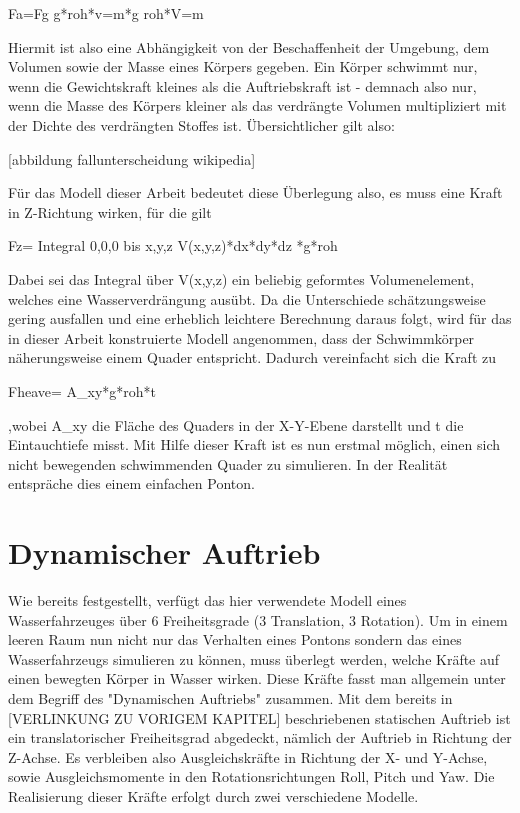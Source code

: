 Fa=Fg
g*roh*v=m*g
roh*V=m

Hiermit ist also eine Abhängigkeit von der Beschaffenheit der Umgebung, dem Volumen sowie der Masse eines Körpers gegeben. 
Ein Körper schwimmt nur, wenn die Gewichtskraft kleines als die Auftriebskraft ist - demnach also nur, wenn die Masse des Körpers kleiner als das verdrängte Volumen multipliziert mit der Dichte des verdrängten Stoffes ist. Übersichtlicher gilt also:

[abbildung fallunterscheidung wikipedia]

Für das Modell dieser Arbeit bedeutet diese Überlegung also, es muss eine Kraft in Z-Richtung wirken, für die gilt

Fz= Integral 0,0,0 bis x,y,z V(x,y,z)*dx*dy*dz *g*roh

Dabei sei das Integral über V(x,y,z) ein beliebig geformtes Volumenelement, welches eine Wasserverdrängung ausübt. 
Da die Unterschiede schätzungsweise gering ausfallen und eine erheblich leichtere Berechnung daraus folgt, wird für das in dieser Arbeit konstruierte Modell angenommen, dass der Schwimmkörper näherungsweise einem Quader entspricht. Dadurch vereinfacht sich die Kraft zu

Fheave= A_xy*g*roh*t

,wobei A_xy die Fläche des Quaders in der X-Y-Ebene darstellt und t die Eintauchtiefe misst. 
Mit Hilfe dieser Kraft ist es nun erstmal möglich, einen sich nicht bewegenden schwimmenden Quader zu simulieren. In der Realität entspräche dies einem einfachen Ponton.

%
\section{Dynamischer Auftrieb}
%
Wie bereits festgestellt, verfügt das hier verwendete Modell eines Wasserfahrzeuges über 6 Freiheitsgrade (3 Translation, 3 Rotation). Um in einem leeren Raum nun nicht nur das Verhalten eines Pontons sondern das eines Wasserfahrzeugs simulieren zu können, muss überlegt werden, welche Kräfte auf einen bewegten Körper in Wasser wirken. Diese Kräfte fasst man allgemein unter dem Begriff des "Dynamischen Auftriebs" zusammen.
Mit dem bereits in [VERLINKUNG ZU VORIGEM KAPITEL] beschriebenen statischen Auftrieb ist ein translatorischer Freiheitsgrad abgedeckt, nämlich der Auftrieb in Richtung der Z-Achse. Es verbleiben also Ausgleichskräfte in Richtung der X- und Y-Achse, sowie Ausgleichsmomente in den Rotationsrichtungen Roll, Pitch und Yaw. Die Realisierung dieser Kräfte erfolgt durch zwei verschiedene Modelle.

